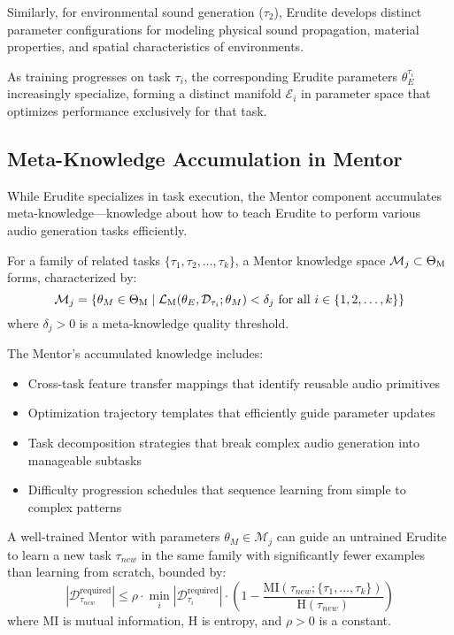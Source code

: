Similarly, for environmental sound generation ($\tau_2$), Erudite develops distinct parameter configurations for modeling physical sound propagation, material properties, and spatial characteristics of environments.

\begin{proposition}
As training progresses on task $\tau_i$, the corresponding Erudite parameters $\theta_E^{\tau_i}$ increasingly specialize, forming a distinct manifold $\mathcal{E}_i$ in parameter space that optimizes performance exclusively for that task.
\end{proposition}

\subsection{Meta-Knowledge Accumulation in Mentor}

While Erudite specializes in task execution, the Mentor component accumulates meta-knowledge—knowledge about how to teach Erudite to perform various audio generation tasks efficiently.

\begin{definition}
For a family of related tasks $\{\tau_1, \tau_2, \ldots, \tau_k\}$, a Mentor knowledge space $\mathcal{M}_j \subset \Theta_{\text{M}}$ forms, characterized by:
\begin{equation}
\mathcal{M}_j = \{\theta_M \in \Theta_{\text{M}} \mid \mathcal{L}_{\text{M}}(\theta_E, \mathcal{D}_{\tau_i}; \theta_M) < \delta_j \text{ for all } i \in \{1,2,\ldots,k\}\}
\end{equation}
where $\delta_j > 0$ is a meta-knowledge quality threshold.
\end{definition}

The Mentor's accumulated knowledge includes:
\begin{itemize}
    \item Cross-task feature transfer mappings that identify reusable audio primitives
    \item Optimization trajectory templates that efficiently guide parameter updates
    \item Task decomposition strategies that break complex audio generation into manageable subtasks
    \item Difficulty progression schedules that sequence learning from simple to complex patterns
\end{itemize}

\begin{theorem}
A well-trained Mentor with parameters $\theta_M \in \mathcal{M}_j$ can guide an untrained Erudite to learn a new task $\tau_{new}$ in the same family with significantly fewer examples than learning from scratch, bounded by:
\begin{equation}
|\mathcal{D}_{\tau_{new}}^{\text{required}}| \leq \rho \cdot \min_i |\mathcal{D}_{\tau_i}^{\text{required}}| \cdot \left(1 - \frac{\text{MI}(\tau_{new}; \{\tau_1,\ldots,\tau_k\})}{\text{H}(\tau_{new})}\right)
\end{equation}
where $\text{MI}$ is mutual information, $\text{H}$ is entropy, and $\rho > 0$ is a constant.
\end{theorem}

